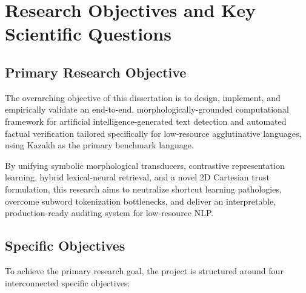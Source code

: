 \section{Research Objectives and Key Scientific Questions}
\label{sec:objectives}

\subsection{Primary Research Objective}
The overarching objective of this dissertation is to design, implement, and empirically validate an end-to-end, morphologically-grounded computational framework for artificial intelligence-generated text detection and automated factual verification tailored specifically for low-resource agglutinative languages, using Kazakh as the primary benchmark language. 

By unifying symbolic morphological transducers, contrastive representation learning, hybrid lexical-neural retrieval, and a novel 2D Cartesian trust formulation, this research aims to neutralize shortcut learning pathologies, overcome subword tokenization bottlenecks, and deliver an interpretable, production-ready auditing system for low-resource NLP.

\subsection{Specific Objectives}
To achieve the primary research goal, the project is structured around four interconnected specific objectives:

